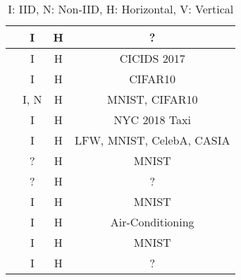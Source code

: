 \begin{table}[ht]
\begin{tabular}{c|c|c|c}
\cite{9079513}                      & I                 & H              & ?                                  \\ \hline
\cite{app8122663}                   & I                 & H              & CICIDS 2017                        \\ \hline
\cite{9347812}                      & I                 & H              & CIFAR10                            \\ \hline
\cite{9134967}                      & I, N              & H              & MNIST, CIFAR10                     \\ \hline
\cite{baffle}                       & I                 & H              & NYC 2018 Taxi                      \\ \hline
\cite{9210531}                      & I                 & H              & LFW, MNIST, CelebA, CASIA          \\ \hline
\cite{8894364}                      & ?                 & H              & MNIST                              \\ \hline
\cite{10.48550/arxiv.2112.07938}    & ?                 & H              & ?                                  \\ \hline
\cite{demo}                         & I                 & H              & MNIST                              \\ \hline
\cite{9233457}                      & I                 & H              & Air-Conditioning                   \\ \hline
\cite{9170559}                      & I                 & H              & MNIST                              \\ \hline
\cite{pirate}                       & I                 & H              & ?                                  \\ \hline
\end{tabular}
\caption*{I: IID, N: Non-IID, H: Horizontal, V: Vertical}
\end{table}
